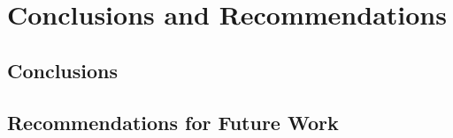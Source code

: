 \section{Conclusions and Recommendations}
\label{sec:Conclusions & Recommendations}

\subsection{Conclusions}
\label{sec:Conclusions}




\subsection{Recommendations for Future Work}
\label{sec:Recommendations for future work}



